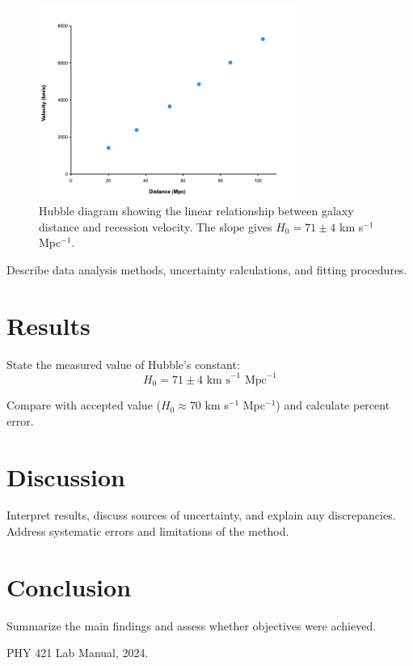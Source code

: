 \documentclass[11pt]{article}
\begin{document}
\begin{figure}[h]
    \centering
    \includegraphics[width=0.75\textwidth]{hubble_plot.png}
    \caption{Hubble diagram showing the linear relationship between galaxy distance and recession velocity. The slope gives $H_0 = 71 \pm 4$ km s$^{-1}$ Mpc$^{-1}$.}
    \label{fig:hubble}
\end{figure}

Describe data analysis methods, uncertainty calculations, and fitting procedures.

\section{Results}
State the measured value of Hubble's constant:
\begin{equation}
    H_0 = 71 \pm 4 \text{ km s}^{-1}\text{ Mpc}^{-1}
\end{equation}

Compare with accepted value ($H_0 \approx 70$ km s$^{-1}$ Mpc$^{-1}$) and calculate percent error.

\section{Discussion}
Interpret results, discuss sources of uncertainty, and explain any discrepancies. Address systematic errors and limitations of the method.

\section{Conclusion}
Summarize the main findings and assess whether objectives were achieved.

\begin{thebibliography}{9}
     PHY 421 Lab Manual, 2024.
\end{thebibliography}
\end{document}
